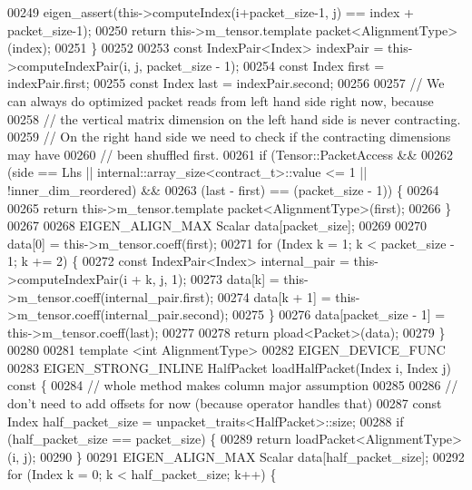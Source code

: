 \begin{DoxyCode}
00249       eigen\_assert(this->computeIndex(i+packet\_size-1, j) == index + packet\_size-1);
00250       \textcolor{keywordflow}{return} this->m\_tensor.template packet<AlignmentType>(index);
00251     \}
00252 
00253     \textcolor{keyword}{const} IndexPair<Index> indexPair = this->computeIndexPair(i, j, packet\_size - 1);
00254     \textcolor{keyword}{const} Index first = indexPair.first;
00255     \textcolor{keyword}{const} Index last = indexPair.second;
00256 
00257     \textcolor{comment}{// We can always do optimized packet reads from left hand side right now, because}
00258     \textcolor{comment}{// the vertical matrix dimension on the left hand side is never contracting.}
00259     \textcolor{comment}{// On the right hand side we need to check if the contracting dimensions may have}
00260     \textcolor{comment}{// been shuffled first.}
00261     \textcolor{keywordflow}{if} (Tensor::PacketAccess &&
00262         (side == Lhs || internal::array\_size<contract\_t>::value <= 1 || !inner\_dim\_reordered) &&
00263         (last - first) == (packet\_size - 1)) \{
00264 
00265       \textcolor{keywordflow}{return} this->m\_tensor.template packet<AlignmentType>(first);
00266     \}
00267 
00268     EIGEN\_ALIGN\_MAX Scalar data[packet\_size];
00269 
00270     data[0] = this->m\_tensor.coeff(first);
00271     \textcolor{keywordflow}{for} (Index k = 1; k < packet\_size - 1; k += 2) \{
00272       \textcolor{keyword}{const} IndexPair<Index> internal\_pair = this->computeIndexPair(i + k, j, 1);
00273       data[k] = this->m\_tensor.coeff(internal\_pair.first);
00274       data[k + 1] = this->m\_tensor.coeff(internal\_pair.second);
00275     \}
00276     data[packet\_size - 1] = this->m\_tensor.coeff(last);
00277 
00278     \textcolor{keywordflow}{return} pload<Packet>(data);
00279   \}
00280 
00281   \textcolor{keyword}{template} <\textcolor{keywordtype}{int} AlignmentType>
00282   EIGEN\_DEVICE\_FUNC
00283   EIGEN\_STRONG\_INLINE HalfPacket loadHalfPacket(Index i, Index j)\textcolor{keyword}{ const }\{
00284     \textcolor{comment}{// whole method makes column major assumption}
00285 
00286     \textcolor{comment}{// don't need to add offsets for now (because operator handles that)}
00287     \textcolor{keyword}{const} Index half\_packet\_size = unpacket\_traits<HalfPacket>::size;
00288     \textcolor{keywordflow}{if} (half\_packet\_size == packet\_size) \{
00289       \textcolor{keywordflow}{return} loadPacket<AlignmentType>(i, j);
00290     \}
00291     EIGEN\_ALIGN\_MAX Scalar data[half\_packet\_size];
00292     \textcolor{keywordflow}{for} (Index k = 0; k < half\_packet\_size; k++) \{

\end{DoxyCode}
